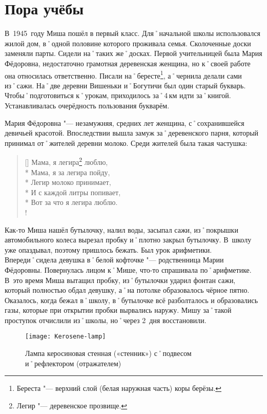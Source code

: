 ﻿\chapter{Пора учёбы}
В~1945~году Миша пошёл в первый класс. Для˚начальной школы использовался жилой дом, в˚одной половине которого проживала семья. Сколоченные доски заменяли парты. Сидели на˚таких же˚досках. Первой учительницей была Мария Фёдоровна, недостаточно грамотная деревенская женщина, но к˚своей работе она относилась ответственно. Писали на˚бересте\footnote{Береста "--- верхний слой (белая наружная часть) коры берёзы.}, а˚чернила делали сами из˚сажи. На˚две деревни Вишеньки и˚Богутичи был один старый букварь. Чтобы˚подготовиться к˚урокам, приходилось за˚4\,км идти за˚книгой. Устанавливалась очерёдность пользования букварём.

Мария Фёдоровна "--- незамужняя, средних лет женщина, с˚сохранившейся девичьей красотой. Впоследствии вышла замуж за˚деревенского парня, который принимал от˚жителей деревни молоко. Среди жителей была такая частушка:

\settowidth{\versewidth}{Легир молоко принимает,}		%
\begin{verse}[\versewidth]
	Мама, я легира\footnote{Легир "--- деревенское прозвище.}  люблю, \\* 
	Мама, я за легира пойду, \\*	
	Легир молоко принимает, \\*
	И с каждой литры попивает, \\*
	Вот за что я легира люблю. \\!
\end{verse}

Как-то Миша нашёл бутылочку, налил воды, засыпал сажи, из˚покрышки автомобильного колеса вырезал пробку и˚плотно закрыл бутылочку. В~школу уже опаздывал, поэтому пришлось бежать. Был урок арифметики. Впереди˚сидела девушка в˚белой кофточке "--- родственница Марии Фёдоровны. Повернулась лицом к˚Мише, что-то спрашивала по˚арифметике. В~это время Миша вытащил пробку, из˚бутылочки ударил фонтан сажи, который полностью обдал девушку, а˚на потолке образовалось чёрное пятно. Оказалось, когда бежал в˚школу, в˚бутылочке всё разболталось и образовались газы, которые при открытии пробки вырвались наружу. Мишу за˚такой проступок отчислили из˚школы, но˚через 2~дня восстановили.

\begin{wrapfigure}{O}{.25\textwidth}
\centering
\texttt{[image: Kerosene-lamp]}
\caption[Лампа керосиновая стенная («стенник») с˚подвесом и˚рефлектором (отражателем)]{Лампа керосиновая стенная («стенник») с˚подвесом и˚рефлектором (отражателем)\footnotemark}
\label{fig:Kerosene-lamp}
\end{wrapfigure}

